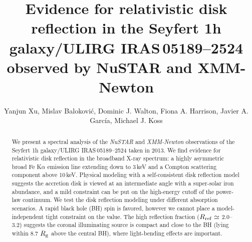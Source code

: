 \documentclass[]{emulateapj}
\def \nustar {{\em NuSTAR }}
\def \xmm {{\em XMM-Newton }}
\def \iras {{IRAS\,05189--2524 }}
\begin{document}
\title{Evidence for relativistic disk reflection in the Seyfert 1h galaxy/ULIRG \iras observed by NuSTAR and XMM-Newton}

\author{Yanjun Xu, Mislav Balokovi\'{c}, Dominic J. Walton, Fiona A. Harrison, Javier A. Garc\'ia, Michael J. Koss}


\begin{abstract}
We present a spectral analysis of the \nustar and \xmm observations of the Seyfert 1h galaxy/ULIRG {IRAS\,05189--2524} taken in 2013. We find evidence for relativistic disk reflection in the broadband X-ray spectrum: a highly asymmetric broad Fe K$\alpha$ emission line extending down to 3\,keV and a Compton scattering component above 10\,keV. Physical modeling with a self-consistent disk reflection model suggests the accretion disk is viewed at an intermediate angle with a super-solar iron abundance, and a mild constraint can be put on the high-energy cutoff of the power-law continuum. We test the disk reflection modeling under different absorption scenarios. A rapid black hole (BH) spin is favored, however we cannot place a model-independent tight constraint on the value. The high reflection fraction ($R_{\rm ref} \simeq$ 2.0--3.2) suggests the coronal illuminating source is compact and close to the BH (lying within 8.7 $R_{\rm g}$ above the central BH), where light-bending effects are important. 
\end{abstract}

\maketitle
\end{document}
